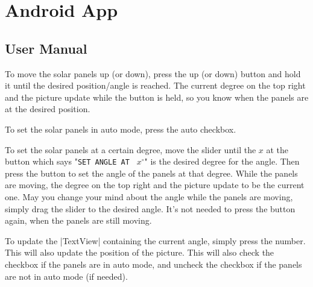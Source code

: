 \documentclass{article}
\begin{document}
	\section{Android App}
		\subsection{User Manual}
			To move the solar panels up (or down), press the up (or down) button and hold it until the desired position/angle is reached. The current degree on the top right and the picture update while the button is held, so you know when the panels are at the desired position.
			
			To set the solar panels in auto mode, press the auto checkbox. 
			
			To set the solar panels at a certain degree, move the slider until the $x$ at the button which says "\verb|SET ANGLE AT | $x^{\circ}$" is the desired degree for the angle. Then press the button to set the angle of the panels at that degree. While the panels are moving, the degree on the top right and the picture update to be the current one. May you change your mind about the angle while the panels are moving, simply drag the slider to the desired angle. It's not needed to press the button again, when the panels are still moving.
			
			To update the |TextView| containing the current angle, simply press the number. This will also update the position of the picture. This will also check the checkbox if the panels are in auto mode, and uncheck the checkbox if the panels are not in auto mode (if needed).
		
\end{document}
